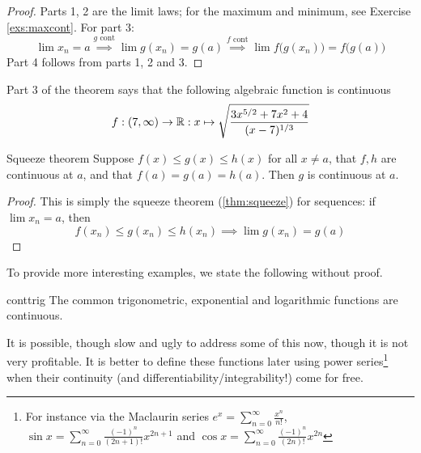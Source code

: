 \begin{proof}
Parts 1, 2 are the limit laws; for the maximum and minimum, see Exercise \ref{exs:maxcont}. For part 3:
\[\lim x_n=a\overset{g\text{ cont}}\implies \lim g(x_n)=g(a) 
\overset{f\text{ cont}}\implies \lim f\bigl(g(x_n)\bigr)=f\bigl(g(a)\bigr)\]
Part 4 follows from parts 1, 2 and 3. 
\end{proof}


\begin{example}{}{}
Part 3 of the theorem says that the following algebraic function is continuous
\[f:(7,\infty)\to\mathbb{R}:x\mapsto \sqrt{\frac{3x^{5/2}+7x^2+4}{(x-7)^{1/3}}}\]
\end{example}

\goodbreak


\begin{thm}{Squeeze theorem}{}
Suppose $f(x)\le g(x)\le h(x)$ for all $x\neq a$, that $f,h$ are continuous at $a$, and that $f(a)=g(a)=h(a)$. Then $g$ is continuous at $a$. 
\end{thm}

\begin{proof}
This is simply the squeeze theorem (\ref{thm:squeeze}) for sequences: if $\lim x_n=a$, then
\[f(x_n)\le g(x_n)\le h(x_n)\implies \lim g(x_n)=g(a)\tag*{\qedhere}\]
\end{proof}

To provide more interesting examples, we state the following without proof.

\begin{thm}{}{conttrig}
The common trigonometric, exponential and logarithmic functions are continuous.
\end{thm}

It is possible, though slow and ugly to address some of this now, though it is not very profitable. It is better to define these functions later using power series\footnote{For instance via the Maclaurin series $e^x=\sum\limits_{n=0}^\infty\frac{x^n}{n!}$, $\sin x=\sum\limits_{n=0}^\infty\frac{(-1)^n}{(2n+1)!}x^{2n+1}$ and $\cos x=\sum\limits_{n=0}^\infty\frac{(-1)^n}{(2n)!}x^{2n}$} when their continuity (and differentiability/integrability!) come for free.

